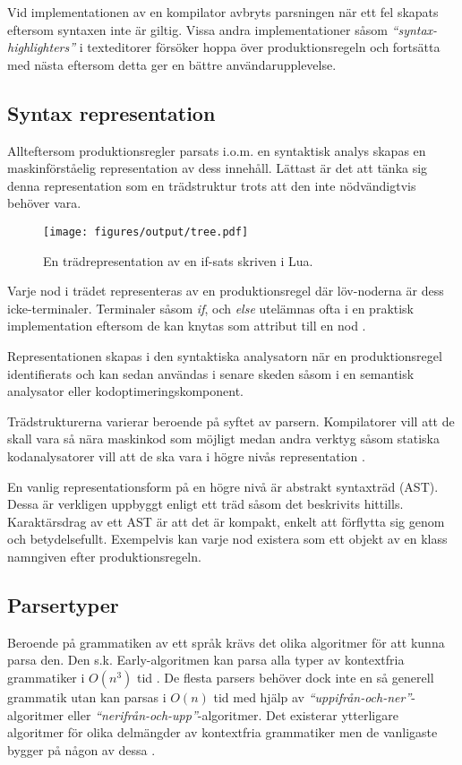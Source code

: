 Vid implementationen av en kompilator avbryts parsningen när ett fel skapats
eftersom syntaxen inte är giltig. Vissa andra implementationer såsom
\textit{``syntax-highlighters''} i texteditorer försöker hoppa över
produktionsregeln och fortsätta med nästa eftersom detta ger en bättre
användarupplevelse.

\subsection{Syntax representation}

Allteftersom produktionsregler parsats i.o.m. en syntaktisk analys skapas en
maskinförståelig representation av dess innehåll. Lättast är det att tänka sig
denna representation som en trädstruktur trots att den inte nödvändigtvis
behöver vara.

\begin{figure}[ht]
  \texttt{[image: figures/output/tree.pdf]}
  \caption{En trädrepresentation av en if-sats skriven i Lua.}
\end{figure}

Varje nod i trädet representeras av en produktionsregel där löv-noderna är
dess icke-terminaler. Terminaler såsom \textit{if}, och \textit{else}
utelämnas ofta i en praktisk implementation eftersom de kan knytas som
attribut till en nod \citep[s. 49]{sm09}.

Representationen skapas i den syntaktiska analysatorn när en produktionsregel
identifierats och kan sedan användas i senare skeden såsom i en semantisk
analysator eller kodoptimeringskomponent.

Trädstrukturerna varierar beroende på syftet av parsern. Kompilatorer vill
att de skall vara så nära maskinkod som möjligt medan andra verktyg såsom
statiska kodanalysatorer vill att de ska vara i högre nivås representation
\citep[s. 6]{pt10}.

En vanlig representationsform på en högre nivå är abstrakt syntaxträd (AST).
Dessa är verkligen uppbyggt enligt ett träd såsom det beskrivits hittills.
Karaktärsdrag av ett AST är att det är kompakt, enkelt att förflytta sig
genom och betydelsefullt. Exempelvis kan varje nod existera som ett objekt av
en klass namngiven efter produktionsregeln.

\subsection{Parsertyper}

Beroende på grammatiken av ett språk krävs det olika algoritmer för att kunna
parsa den. Den s.k. Early-algoritmen kan parsa alla typer av kontextfria
grammatiker i $O(n^3)$ tid \citep[s.  67]{sm09}. De flesta parsers behöver
dock inte en så generell grammatik utan kan parsas i $O(n)$ tid med hjälp av
\textit{``uppifrån-och-ner''}-algoritmer eller
\textit{``nerifrån-och-upp''}-algoritmer. Det existerar ytterligare
algoritmer för olika delmängder av kontextfria grammatiker men de vanligaste
bygger på någon av dessa \citep[s. 61]{aa06}.

